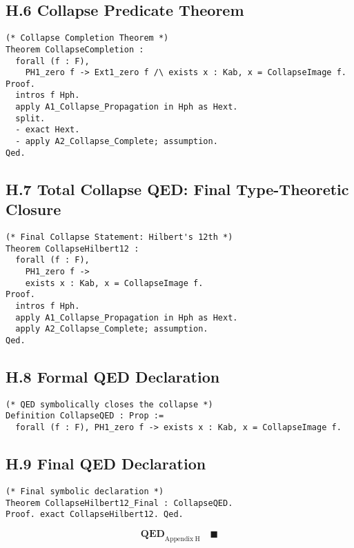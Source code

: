 \documentclass[11pt]{article}
\begin{document}
\subsection*{H.6 Collapse Predicate Theorem}

\begin{lstlisting}[language=Coq]
(* Collapse Completion Theorem *)
Theorem CollapseCompletion :
  forall (f : F),
    PH1_zero f -> Ext1_zero f /\ exists x : Kab, x = CollapseImage f.
Proof.
  intros f Hph.
  apply A1_Collapse_Propagation in Hph as Hext.
  split.
  - exact Hext.
  - apply A2_Collapse_Complete; assumption.
Qed.
\end{lstlisting}

\subsection*{H.7 Total Collapse QED: Final Type-Theoretic Closure}

\begin{lstlisting}[language=Coq]
(* Final Collapse Statement: Hilbert's 12th *)
Theorem CollapseHilbert12 :
  forall (f : F),
    PH1_zero f ->
    exists x : Kab, x = CollapseImage f.
Proof.
  intros f Hph.
  apply A1_Collapse_Propagation in Hph as Hext.
  apply A2_Collapse_Complete; assumption.
Qed.
\end{lstlisting}

\subsection*{H.8 Formal QED Declaration}

\begin{lstlisting}[language=Coq]
(* QED symbolically closes the collapse *)
Definition CollapseQED : Prop :=
  forall (f : F), PH1_zero f -> exists x : Kab, x = CollapseImage f.
\end{lstlisting}

\subsection*{H.9 Final QED Declaration}

\begin{lstlisting}[language=Coq]
(* Final symbolic declaration *)
Theorem CollapseHilbert12_Final : CollapseQED.
Proof. exact CollapseHilbert12. Qed.
\end{lstlisting}

\[
\textbf{QED}_{\mathrm{Appendix\ H}} \quad \blacksquare
\]
\end{document}
